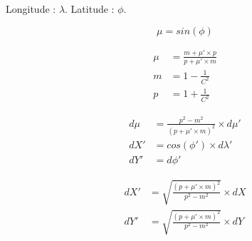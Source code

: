 \documentclass[12pt]{article}
\begin{document}
Longitude : $ \lambda $. Latitude : $ \phi $.

\begin{equation*}
\mu = sin \left(\phi\right)
\end{equation*}

\begin{align*}
\mu &= \frac{m + \mu' \times p}{p + \mu' \times m} \\
m &= 1 - \frac{1}{C^2} \\
p &= 1 + \frac{1}{C^2}
\end{align*}

\begin{align*}
d\mu &= \frac{p^2 - m^2}{\left(p + \mu' \times m\right)^2} \times d\mu' \\
dX' &= cos \left(\phi'\right) \times d\lambda' \\
dY' &= d\phi'
\end{align*}

\begin{align*}
dX' &= \sqrt{\frac{\left(p + \mu' \times m\right)^2}{p^2 - m^2}} \times dX \\
dY' &= \sqrt{\frac{\left(p + \mu' \times m\right)^2}{p^2 - m^2}} \times dY
\end{align*}
\end{document}
